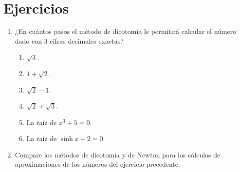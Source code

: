 \section{Ejercicios}
\begingroup
\small
\begin{multicols}{2}
\begin{enumerate}
\item ¿En cuántos pasos el método de dicotomía le permitirá calcular el número dado con $3$ cifras decimales exactas?
    \begin{enumerate}
    \item $\sqrt{3}$.
    \item $1 + \sqrt{2}$.
    \item $\sqrt{2} - 1$.
    \item $\sqrt{2} + \sqrt{3}$.
    \item La raíz de $x^3 + 5 = 0$.
    \item La raíz de $\sinh x + 2 = 0$.
    \end{enumerate}

\item Compare los métodos de dicotomía y de Newton para los cálculos de aproximaciones de los números del ejercicio precedente.
\end{enumerate}
\end{multicols}
\endgroup
%
%
%
